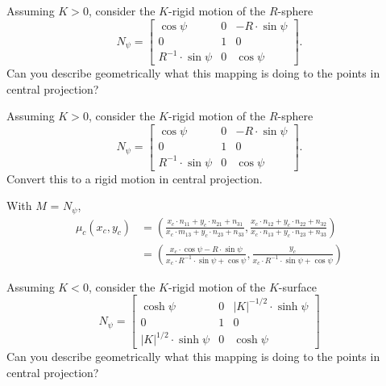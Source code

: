 \documentclass[newpage,hints,handout,12pt,nooutcomes,noauthor]{ximera}
\begin{document}
\begin{problem}
  Assuming $K > 0$, consider the $K$-rigid motion of the $R$-sphere
  \[
  N_\psi=
  \begin{bmatrix}
    \cos\psi & 0 & -R\cdot\sin\psi\\
    0 & 1 & 0\\
    R^{-1}\cdot\sin\psi & 0 & \cos\psi
  \end{bmatrix}.
  \]
Can you describe geometrically what this mapping is doing to the
points in central projection?  
\end{problem}


\begin{problem}
  Assuming $K > 0$, consider the $K$-rigid motion of the $R$-sphere
  \[
  N_\psi=
  \begin{bmatrix}
    \cos\psi & 0 & -R\cdot\sin\psi\\
    0 & 1 & 0\\
    R^{-1}\cdot\sin\psi & 0 & \cos\psi
  \end{bmatrix}.
  \]
  Convert this to a rigid motion in central projection.
  
  \begin{freeResponse}
   With $M$ = $N_\psi$,
  \begin{align*}
  \mu_c(x_c,y_c) &= \left( \frac{x_c\cdot n_{11} + y_c\cdot n_{21} + n_{31}}{x_c\cdot m_{13} + y_c\cdot n_{23} + n_{33}},
    \frac{x_c\cdot n_{12} + y_c\cdot n_{22} + n_{32}}{x_c\cdot n_{13} + y_c\cdot n_{23} + n_{33}} \right) \\
    &= \left( \frac{x_c\cdot \cos\psi - R\cdot \sin\psi}{x_c\cdot R^{-1} \cdot \sin\psi + \cos\psi},
    \frac{y_c}{x_c\cdot R^{-1} \cdot \sin\psi + \cos\psi} \right) 
  \end{align*}
  \end{freeResponse}

\end{problem}


\begin{problem}
  Assuming $K < 0$, consider the $K$-rigid motion of the $K$-surface
  \[
  N_\psi=
  \begin{bmatrix}
    \cosh\psi & 0 & |K|^{-1/2}\cdot\sinh\psi\\
    0 & 1 & 0\\
    |K|^{1/2}\cdot\sinh\psi & 0 & \cosh\psi
  \end{bmatrix}
  \]
  Can you describe geometrically what this mapping is doing to the
  points in central projection?
\end{problem}
\end{document}
